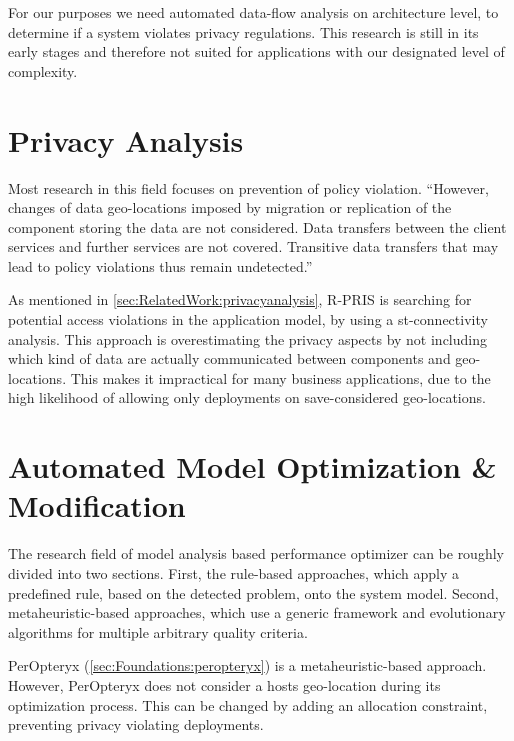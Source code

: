 For our purposes we need automated data-flow analysis on architecture level, to determine if a system violates privacy regulations. This research is still in its early stages and therefore not suited for applications with our designated level of complexity.


\section{Privacy Analysis}
\label{sec:RelatedWork:privacy_check}

Most research in this field focuses on prevention of policy violation. “However, changes of data geo-locations imposed by migration or replication of the component storing the data are not considered. Data transfers between the client services and further services are not covered. Transitive data transfers that may lead to policy violations thus remain undetected.”\cite{Schmieders.2015}

As mentioned in \autoref{sec:RelatedWork:privacyanalysis}, R-PRIS is searching for potential access violations in the application model, by using a st-connectivity analysis.\cite{Schmieders.2015}\cite{Schmieders.} This approach is overestimating the privacy aspects by not including which kind of data are actually communicated between components and geo-locations. This makes it impractical for many business applications, due to the high likelihood of allowing only deployments on save-considered geo-locations.


\section{Automated Model Optimization \& Modification}
\label{sec:RelatedWork:auto_model_opt}

The research field of model analysis based performance optimizer can be roughly divided into two sections. First, the rule-based approaches, which apply a predefined rule, based on the detected problem, onto the system model. Second, metaheuristic-based approaches, which use a generic framework and evolutionary algorithms for multiple arbitrary quality criteria.\cite{Martens.2010}

PerOpteryx (\autoref{sec:Foundations:peropteryx}) is a metaheuristic-based approach. However, PerOpteryx does not consider a hosts geo-location during its optimization process. This can be changed by adding an allocation constraint, preventing privacy violating deployments. 




